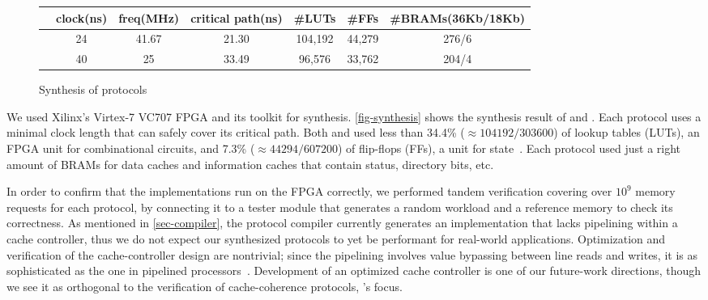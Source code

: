 \documentclass[sigplan,10pt,review,anonymous,screen]{acmart}\settopmatter{printfolios=true,printccs=false,printacmref=false}
\begin{document}
\begin{figure}[h]
  \centering\footnotesize
  \begin{tabular}{|c|c|c|c|c|c|c|}
    \hline
    & clock\;(ns) & freq\;(MHz) & critical path\;(ns) & \#LUTs & \#FFs & \#BRAMs\;(36Kb/18Kb) \\
    \hline
    \bhemh{} & 24 & 41.67 & 21.30 & 104,192 & 44,279 & 276/6 \\
    \bhemt{} & 40 & 25 & 33.49 & 96,576 & 33,762 & 204/4 \\
    \hline
  \end{tabular}
  \caption{Synthesis of \hemiola{} protocols}
  \label{fig-synthesis}
\end{figure}


We used Xilinx's Virtex-7 VC707 FPGA and its toolkit for synthesis.
\autoref{fig-synthesis} shows the synthesis result of \bhemh{} and \bhemt{}.
Each protocol uses a minimal clock length that can safely cover its critical path.
Both \bhemh{} and \bhemt{} used less than 34.4\% ($\approx 104192/303600$) of lookup tables (LUTs), an FPGA unit for combinational circuits, and 7.3\% ($\approx 44294/607200$) of flip-flops (FFs), a unit for state~\cite{vc707}.
Each protocol used just a right amount of BRAMs for data caches and information caches that contain status, directory bits, etc.

In order to confirm that the implementations run on the FPGA correctly, we performed tandem verification covering over $10^9$ memory requests for each protocol, by connecting it to a tester module that generates a random workload and a reference memory to check its correctness.
As mentioned in \autoref{sec-compiler}, the protocol compiler currently generates an implementation that lacks pipelining within a cache controller, thus we do not expect our synthesized protocols to yet be performant for real-world applications.
Optimization and verification of the cache-controller design are nontrivial; since the pipelining involves value bypassing between line reads and writes, it is as sophisticated as the one in pipelined processors~\cite{comarch}.
Development of an optimized cache controller is one of our future-work directions, though we see it as orthogonal to the verification of cache-coherence protocols, \hemiola{}'s focus.
\end{document}
